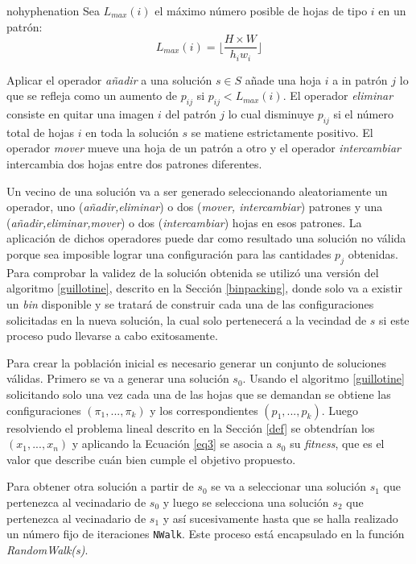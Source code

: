 \documentclass[a4paper,10pt,twocolumn]{article}
\begin{document}
\begin{hyphenrules}{nohyphenation}
Sea $L_{max}(i)$ el máximo número posible de hojas de tipo $i$ en un patrón:
$$ L_{max}(i) = \lfloor \frac{H \times W}{h_iw_i} \rfloor$$

Aplicar el operador \textit{añadir} a una solución $s \in S$ añade una hoja $i$ a in patrón $j$ lo que se refleja como un aumento de $p_{ij}$ si $p_{ij} < L_{max}(i)$. El operador \textit{eliminar} consiste en quitar una imagen $i$ del patrón $j$ lo cual disminuye $p_{ij}$ si el número total de hojas $i$ en toda la solución $s$ se matiene estrictamente positivo. El operador \textit{mover} mueve una hoja de un patrón a otro y el operador \textit{intercambiar} intercambia dos hojas entre dos patrones diferentes. 

Un vecino de una solución va a ser generado seleccionando aleatoriamente un operador, uno (\textit{añadir,eliminar}) o dos (\textit{mover, intercambiar}) patrones y una (\textit{añadir,eliminar,mover}) o dos (\textit{intercambiar}) hojas en esos patrones. La aplicación de dichos operadores puede dar como resultado una solución no válida porque sea imposible lograr una configuración para las cantidades $p_j$ obtenidas. Para comprobar la validez de la solución obtenida se utilizó una versión del algoritmo \ref{guillotine}, descrito en la Sección \ref{binpacking}, donde solo va a existir un \textit{bin} disponible y se tratará de construir cada una de las configuraciones solicitadas en la nueva solución, la cual solo pertenecerá a la vecindad de $s$ si este proceso pudo llevarse a cabo exitosamente.      

Para crear la población inicial es necesario generar un conjunto de soluciones válidas. Primero se va a generar una solución $s_0$. Usando el algoritmo \ref{guillotine} solicitando solo una vez cada una de las hojas que se demandan se obtiene las configuraciones $(\pi_1,...,\pi_k)$ y los correspondientes $(p_1,...,p_k)$. Luego resolviendo el problema lineal descrito en la Sección \ref{def} se obtendrían los $(x_1,...,x_n)$ y aplicando la Ecuación \ref{eq3} se asocia a $s_0$ su \textit{fitness}, que es el valor que describe cuán bien cumple el objetivo propuesto. 

Para obtener otra solución a partir de $s_0$ se va a seleccionar una solución $s_1$ que pertenezca al vecinadario de $s_0$ y luego se selecciona una solución $s_2$ que pertenezca al vecinadario de $s_1$ y así sucesivamente hasta que se halla realizado un
número fijo de iteraciones \texttt{NWalk}. Este proceso está encapsulado en la función \textit{RandomWalk(s)}. 


\end{hyphenrules}
\end{document}
